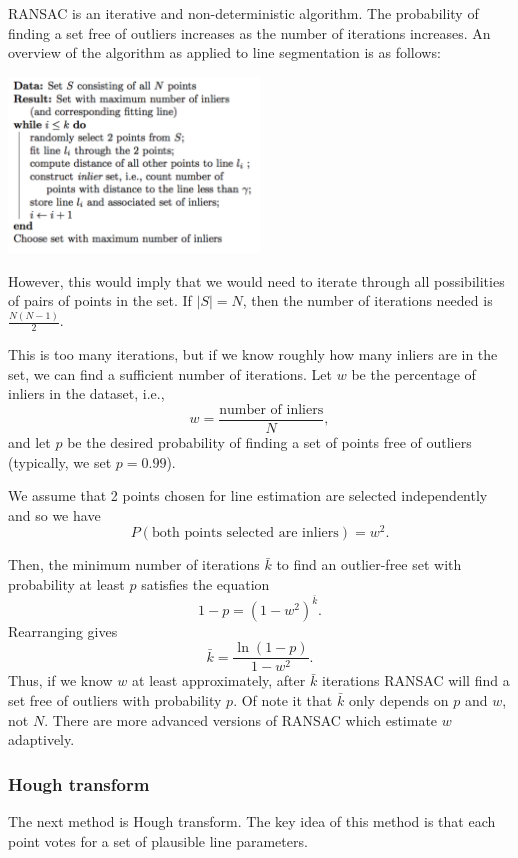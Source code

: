 \documentclass[twoside]{article}
\begin{document}
RANSAC is an iterative and non-deterministic algorithm. The probability of finding a set free of outliers increases as the number of iterations increases. An overview of the algorithm as applied to line segmentation is as follows:
\begin{center}
	\includegraphics[width=0.5\textwidth]{RANSACOverview}
\end{center}

However, this would imply that we would need to iterate through all possibilities of pairs of points in the set. If $|S| = N$, then the number of iterations needed is
$\frac{N(N-1)}{2}.$

This is too many iterations, but if we know roughly how many inliers are in the set, we can find a sufficient number of iterations. Let $w$ be the percentage of inliers in the dataset, i.e.,
$$w = \frac{\text{number of inliers}}{N},$$
and let $p$ be the desired probability of finding a set of points free of outliers (typically, we set $p=0.99$).

We assume that 2 points chosen for line estimation are selected independently and so we have
$$P(\text{both points selected are inliers}) = w^2.$$

Then, the minimum number of iterations $\bar{k}$ to find an outlier-free set with probability at least $p$ satisfies the equation
$$ 1-p = (1-w^2)^{\bar{k}}.$$
Rearranging gives $$\bar{k} = \frac{\ln(1-p)}{1-w^2}.$$
Thus, if we know $w$ at least approximately, after $\bar{k}$ iterations RANSAC will find a set free of outliers with probability $p$. Of note it that $\bar{k}$ only depends on $p$ and $w$, not $N$. There are more advanced versions of RANSAC which estimate $w$ adaptively.

\subsubsection{Hough transform}
The next method is Hough transform. The key idea of this method is that each point votes for a set of plausible line parameters.
\end{document}
